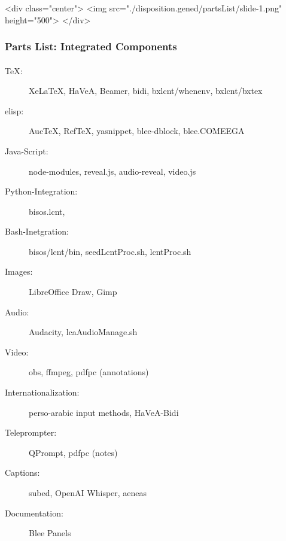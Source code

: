 \begin{whenOrg}
\begin{htmlonly}
\begin{frame}[fragile,plain,label=partsList]
    \frametitle{}
    \framesubtitle{}
    \begin{rawhtml}
<div class="center">
<img src="./disposition.gened/partsList/slide-1.png" height="500">
</div>
    \end{rawhtml}
\end{frame}
\end{htmlonly}

\begin{verblatex}

\begin{frame}[fragile,plain,label=partsList]
    \frametitle{Parts List: Integrated Components}
    \framesubtitle{}

\begin{description}
\item[TeX:] XeLaTeX, HaVeA, Beamer, bidi, {\color{violet}bxlcnt/whenenv}, {\color{violet}bxlcnt/bxtex}
\item[elisp:] AucTeX, RefTeX, yasnippet, {\color{violet}blee-dblock}, {\color{violet}blee.COMEEGA}
\item[Java-Script:] node-modules, reveal.js, audio-reveal, video.js
\item[Python-Integration:] {\color{violet}bisos.lcnt},
\item[Bash-Inetgration:] {\color{violet}bisos/lcnt/bin}, {\color{violet}seedLcntProc.sh}, {\color{violet}lcntProc.sh}
\item[Images:] LibreOffice Draw, Gimp
\item[Audio:] Audacity, {\color{violet}lcaAudioManage.sh}
\item[Video:] obs, ffmpeg, pdfpc (annotations)
\item [Internationalization:]  {\color{violet}perso-arabic input methods}, {\color{violet}HaVeA-Bidi}
\item[Teleprompter:] QPrompt, pdfpc (notes)
\item[Captions:] subed, OpenAI Whisper, aeneas
\item[Documentation:] {\color{violet}Blee Panels}
\end{description}

\end{frame}
\end{verblatex}
\end{whenOrg}
